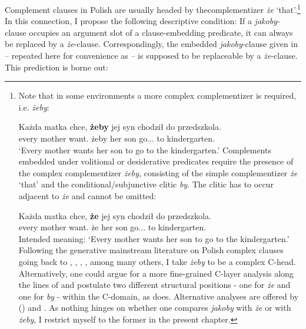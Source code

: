 \documentclass[output=paper
,modfonts
,nonflat]{langsci/langscibook}
\begin{document}
Complement clauses in Polish are usually headed by the\linebreak complementizer \emph{że} `that'.\footnote{Note that in some environments a more complex complementizer is required, i.e. \emph{żeby}:

\ea \gll Każda matka chce, \textbf{żeby} jej syn chodził do przedszkola. \\
		every mother want.{\thirdperson}{\sg} żeby her son go.{\lptcp}.{\sg}.{\masc} to kindergarten.{\gen} \\
\glt	`Every mother wants her son to go to the kindergarten.'
\z
Complements embedded under volitional or desiderative predicates require the presence of the complex complementizer \emph{żeby}, consisting of the simple complementizer \emph{że} `that' and the conditional\slash subjunctive clitic \emph{by}. The clitic has to occur adjacent to \emph{że} and cannot be omitted:

\ea \gll *Każda matka chce, \textbf{że} jej syn chodził do przedszkola. \\
		every mother want.{\thirdperson}{\sg} że her son go.{\lptcp}.{\sg}.{\masc} to kindergarten.{\gen} \\
\glt	Intended meaning: `Every mother wants her son to go to the kindergarten.'
\z
Following the generative mainstream literature on Polish complex clauses going back to \textcite{Tajsner1989}, \textcite{Willim1989}, \textcite{Witkos1998}, \textcite{Bondaruk2004}, among many others, I take \emph{żeby} to be a complex C-head. Alternatively, one could argue for a more fine-grained C-layer analysis along the lines of \textcite{Rizzi1997} and postulate two different structural positions - one for \emph{że} and one for \emph{by} - within the C-domain, as \textcite{Szczegielniak1999} does. Alternative analyses are offered by \citeauthor{Migdalski2016} (\citeyear{Migdalski2006, Migdalski2009, Migdalski2016}) and \textcite{Tomaszewicz2012}. As nothing hinges on whether one compares \emph{jakoby} with \emph{że} or with \emph{żeby}, I restrict myself to the former in the present chapter.
}
In this connection, I propose the following descriptive condition: If a \emph{jakoby}-clause occupies an argument slot of a clause-embedding predicate, it can always be replaced by a \emph{że}-clause. Correspondingly, the embedded \emph{jakoby}-clause  given in  – repeated here for convenience as  – is supposed to be replaceable by a \emph{że}-clause. This prediction is borne out:
\end{document}
